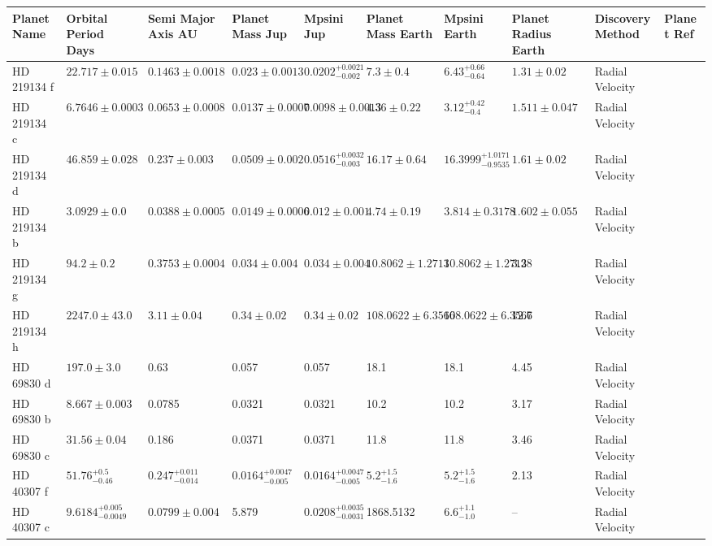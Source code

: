 \begin{tabular}{llllllllll}
\toprule
Planet Name & Orbital Period Days & Semi Major Axis AU & Planet Mass Jup & Mpsini Jup & Planet Mass Earth & Mpsini Earth & Planet Radius Earth & Discovery Method & Planet Ref \\
\midrule
HD 219134 f & $22.717 \pm 0.015$ & $0.1463 \pm 0.0018$ & $0.023 \pm 0.0013$ & $0.0202^{+0.0021}_{-0.002}$ & $7.3 \pm 0.4$ & $6.43^{+0.66}_{-0.64}$ & $1.31 \pm 0.02$ & Radial Velocity & \cite{GILLON_ET_AL__2017} \\
HD 219134 c & $6.7646 \pm 0.0003$ & $0.0653 \pm 0.0008$ & $0.0137 \pm 0.0007$ & $0.0098 \pm 0.0013$ & $4.36 \pm 0.22$ & $3.12^{+0.42}_{-0.4}$ & $1.511 \pm 0.047$ & Radial Velocity & \cite{GILLON_ET_AL__2017} \\
HD 219134 d & $46.859 \pm 0.028$ & $0.237 \pm 0.003$ & $0.0509 \pm 0.002$ & $0.0516^{+0.0032}_{-0.003}$ & $16.17 \pm 0.64$ & $16.3999^{+1.0171}_{-0.9535}$ & $1.61 \pm 0.02$ & Radial Velocity & \cite{GILLON_ET_AL__2017} \\
HD 219134 b & $3.0929 \pm 0.0$ & $0.0388 \pm 0.0005$ & $0.0149 \pm 0.0006$ & $0.012 \pm 0.001$ & $4.74 \pm 0.19$ & $3.814 \pm 0.3178$ & $1.602 \pm 0.055$ & Radial Velocity & \cite{GILLON_ET_AL__2017} \\
HD 219134 g & $94.2 \pm 0.2$ & $0.3753 \pm 0.0004$ & $0.034 \pm 0.004$ & $0.034 \pm 0.004$ & $10.8062 \pm 1.2713$ & $10.8062 \pm 1.2713$ & 3.28 & Radial Velocity & \cite{VOGT_ET_AL__2015} \\
HD 219134 h & $2247.0 \pm 43.0$ & $3.11 \pm 0.04$ & $0.34 \pm 0.02$ & $0.34 \pm 0.02$ & $108.0622 \pm 6.3566$ & $108.0622 \pm 6.3566$ & 12.7 & Radial Velocity & \cite{VOGT_ET_AL__2015} \\
HD 69830 d & $197.0 \pm 3.0$ & 0.63 & 0.057 & 0.057 & 18.1 & 18.1 & 4.45 & Radial Velocity & \cite{LOVIS_ET_AL__2006} \\
HD 69830 b & $8.667 \pm 0.003$ & 0.0785 & 0.0321 & 0.0321 & 10.2 & 10.2 & 3.17 & Radial Velocity & \cite{LOVIS_ET_AL__2006} \\
HD 69830 c & $31.56 \pm 0.04$ & 0.186 & 0.0371 & 0.0371 & 11.8 & 11.8 & 3.46 & Radial Velocity & \cite{LOVIS_ET_AL__2006} \\
HD 40307 f & $51.76^{+0.5}_{-0.46}$ & $0.247^{+0.011}_{-0.014}$ & $0.0164^{+0.0047}_{-0.005}$ & $0.0164^{+0.0047}_{-0.005}$ & $5.2^{+1.5}_{-1.6}$ & $5.2^{+1.5}_{-1.6}$ & 2.13 & Radial Velocity & \cite{TUOMI_ET_AL__2013} \\
HD 40307 c & $9.6184^{+0.005}_{-0.0049}$ & $0.0799 \pm 0.004$ & 5.879 & $0.0208^{+0.0035}_{-0.0031}$ & 1868.5132 & $6.6^{+1.1}_{-1.0}$ & -- & Radial Velocity & \cite{TUOMI_ET_AL__2013} \\

\end{tabular}
